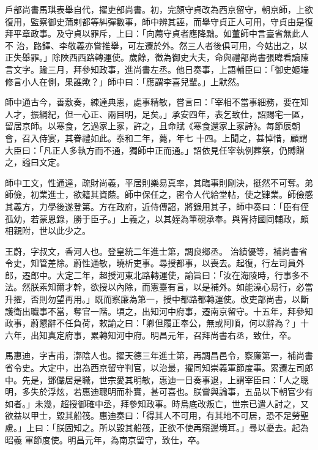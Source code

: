 \begin{pinyinscope}
 戶部尚書馬琪表舉自代，擢吏部尚書。初，完顏守貞改為西京留守，朝京師，上欲復用，監察御史蒲剌都等糾彈數事，師中辨其誣，而舉守貞正人可用，守貞由是復拜平章政事。及守貞以罪斥，上曰：「向薦守貞者應降黜。如董師中言臺省無此人不
 治，路鐸、李敬義亦嘗推舉，可左遷於外。然三人者後俱可用，今姑出之，以正失舉罪。」除陜西西路轉運使。歲餘，徵為御史大夫，命與禮部尚書張暐看讀陳言文字。踰三月，拜參知政事，進尚書左丞。他日奏事，上語輔臣曰：「御史姬端修言小人在側，果誰歟？」師中曰：「應謂李喜兒輩。」上默然。



 師中通古今，善敷奏，練達典憲，處事精敏，嘗言曰：「宰相不當事細務，要在知人才，振綱紀，但一心正、兩目明，足矣。」承安四年，表乞致仕，詔賜宅一區，留居京師。以寒食，乞過家上冢，許之，且命賦《寒食還家上冢詩》。每節辰朝會，召入侍宴，其眷禮如此。泰和二年，薨，年七
 十四。上聞之，甚悼惜，顧謂大臣曰：「凡正人多執方而不通，獨師中正而通。」詔依見任宰執例葬祭，仍賻贈之，謚曰文定。



 師中工文，性通達，疏財尚義，平居則樂易真率，其臨事則剛決，挺然不可奪。弟師儉，初業進士，欲籍其資蔭。師中保任之，密令人代給堂帖，使之肄業。師儉感其義方，力學後遂登第。方在政府，近侍傳詔，將錄用其子，師中奏曰：「臣有侄孤幼，若蒙恩錄，勝于臣子。」上義之，以其姪為筆硯承奉。與胥持國同輔政，頗相親附，世以此少之。



 王蔚，字叔文，香河人也。登皇統二年進士第，調良鄉丞。
 治績優等，補尚書省令史，知管差除。蔚性通敏，曉析吏事。尋授都事，以喪去。起復，行左司員外郎，遷郎中。大定二年，超授河東北路轉運使，諭旨曰：「汝在海陵時，行事多不法。然朕素知爾才幹，欲授以內除，而憲臺有言，以是補外。如能澡心易行，必當升擢，否則勿望再用。」既而察廉為第一，授中都路都轉運使。改吏部尚書，以斷護衛出職事不當，奪官一階。頃之，出知河中府事，遷南京留守。十五年，拜參知政事，蔚懇辭不任負荷，敕諭之曰：「卿但履正奉公，無或阿順，何以辭為？」十六年，出知真定府事，累轉知河中府。明昌元年，召拜尚書右丞，致仕，卒。



 馬惠迪，字吉甫，漷陰人也。擢天德三年進士第，再調昌邑令，察廉第一，補尚書省令史。大定中，出為西京留守判官，以治最，擢同知崇義軍節度事。累遷左司郎中。先是，鄧儼居是職，世宗愛其明敏，惠迪一日奏事退，上謂宰臣曰：「人之聰明，多失於浮炫，若惠迪聰明而朴實，甚可喜也。朕嘗與論事，五品以下朝官少有如者。」未幾，超授御確中丞，拜參知政事。時烏底改叛亡，世宗已遣人討之，又欲益以甲士，毀其船筏。惠迪奏曰：「得其人不可用，有其地不可居，恐不足勞聖慮。」上曰：「朕固知之。所以毀其船筏，正欲不使再窺邊境耳。」尋以憂去。起為昭義
 軍節度使。明昌元年，為南京留守，致仕，卒。




\end{pinyinscope}
